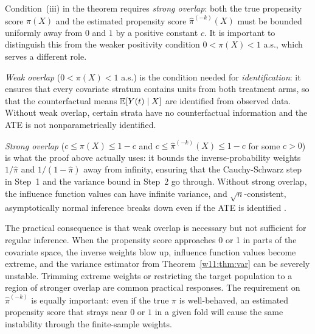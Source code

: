 \documentclass[master.tex]{subfiles}
\begin{document}
\begin{remark}
\label{w11:rem:overlap}
Condition~(iii) in the theorem requires \emph{strong overlap}: both
the true propensity score $\pi(X)$ and the estimated propensity score
$\hat\pi^{(-k)}(X)$ must be bounded uniformly away from $0$ and $1$
by a positive constant $c$.  It is important to distinguish this from
the weaker positivity condition $0 < \pi(X) < 1$ a.s., which serves
a different role.

\emph{Weak overlap} ($0 < \pi(X) < 1$ a.s.) is the condition needed
for \emph{identification}: it ensures that every covariate stratum
contains units from both treatment arms, so that the counterfactual
means $\mathbb{E}[Y(t) \mid X]$ are identified from observed data.  Without
weak overlap, certain strata have no counterfactual information and the
ATE is not nonparametrically identified.

\emph{Strong overlap} ($c \leq \pi(X) \leq 1-c$ and
$c \leq \hat\pi^{(-k)}(X) \leq 1-c$ for some $c > 0$) is what
the proof above actually uses: it bounds the inverse-probability
weights $1/\hat\pi$ and $1/(1-\hat\pi)$ away from infinity, ensuring
that the Cauchy-Schwarz step in Step~1 and the variance bound in
Step~2 go through.  Without strong overlap, the influence function
values can have infinite variance, and $\sqrt{n}$-consistent,
asymptotically normal inference breaks down even if the ATE is
identified \citep{khan2010irregular}.

The practical consequence is that weak overlap is necessary but not
sufficient for regular inference.  When the propensity score
approaches 0 or 1 in parts of the covariate space, the inverse
weights blow up, influence function values become extreme, and the
variance estimator from Theorem~\ref{w11:thm:var} can be severely
unstable.  Trimming extreme weights or restricting the target
population to a region of stronger overlap are common practical
responses.  The requirement on $\hat\pi^{(-k)}$ is equally
important: even if the true $\pi$ is well-behaved, an estimated
propensity score that strays near $0$ or $1$ in a given fold will
cause the same instability through the finite-sample weights.
\end{remark}
\end{document}
